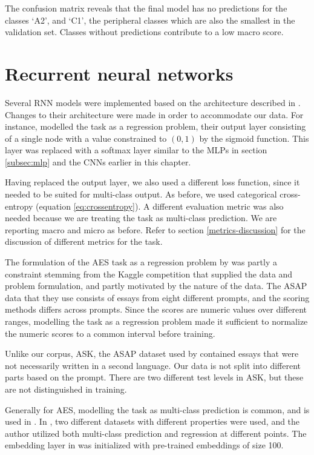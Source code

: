 The confusion matrix reveals that the final model has no predictions for the
classes `A2', and `C1', the peripheral classes which are also the smallest in
the validation set. Classes without predictions contribute to a low macro \FI
score.


\section{Recurrent neural networks}

Several \ac{RNN} models were implemented based on the architecture described in
\textcite{taghipour16}. Changes to their architecture were made in
order to accommodate our data. For instance, \citeauthor{taghipour16} modelled
the task as a regression problem, their output layer consisting of a single
node with a value constrained to $(0,1)$ by the sigmoid function. This layer
was replaced with a softmax layer similar to the \acp{MLP} in section
\ref{subsec:mlp} and the \acp{CNN} earlier in this chapter.

Having replaced the output layer, we also used a different loss function,
since it needed to be suited for multi-class output. As before, we used
categorical cross-entropy (equation \ref{eq:crossentropy}). A different
evaluation metric was also needed because we are treating the task as
multi-class prediction. We are reporting macro and micro \FI as before. Refer
to section \ref{metrics-discussion} for the discussion of different metrics
for the task.

The formulation of the \ac{AES} task as a regression problem by
\citeauthor{taghipour16} was partly a constraint stemming from the Kaggle
competition that supplied the data and problem formulation, and partly
motivated by the nature of the data. The ASAP data that they use consists of
essays from eight different prompts, and the scoring methods differs across
prompts. Since the scores are numeric values over different ranges, modelling
the task as a regression problem made it sufficient to normalize the numeric
scores to a common interval before training.

Unlike our corpus, ASK, the ASAP dataset used by \citeauthor{taghipour16}
contained essays that were not necessarily written in a second language. Our
data is not split into different parts based on the prompt. There are two
different test levels in ASK, but these are not distinguished in training.

 Generally for \ac{AES}, modelling
the task as multi-class prediction is common, and is used in
\textcite{vajjala18universalCEFR}. In \textcite{vajjala17}, two different
datasets with different properties were used, and the author utilized both
multi-class prediction and regression at different points. The embedding
layer in \textcite{taghipour16} was initialized with pre-trained embeddings
of size 100.


